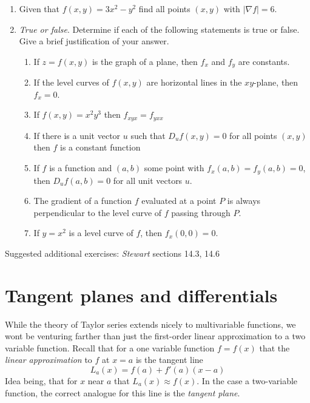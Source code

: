 \documentclass[12pt]{article}
\numberwithin{equation}{subsection}
\numberwithin{figure}{subsection}
\theoremstyle{note}
\begin{document}
{\begin{enumerate}[label=\arabic*.]
\begin{enumerate}
	\item $f(x,y)=5x^2+y^6$
	\item $f(x,y)=(x^2+y^2)^{3/2}$
	\item $f(x,y,z)=y^2z e^x$
\end{enumerate}

\item Given that $f(x,y)=3x^2-y^2$ find all points $(x,y)$ with $|\nabla f|=6$. 


\item \textit{True or false}. Determine if each of the following statements is true or false. Give a brief justification of your answer.

\begin{enumerate}
	\item If $z=f(x,y)$ is the graph of a plane, then $f_x$ and $f_y$ are constants. 
	\item If the level curves of $f(x,y)$ are horizontal lines in the $xy$-plane, then $f_{x}=0$.
	\item If $f(x,y)=x^2y^3$ then $f_{xyx}=f_{yxx}$
	\item If there is a unit vector $u$ such that $D_u f(x,y)=0$ for all points $(x,y)$ then $f$ is a constant function
	\item If $f$ is a function and $(a,b)$ some point with $f_x(a,b)=f_y(a,b)=0$, then $D_uf(a,b)=0$ for all unit vectors $u$.
	\item The gradient of a function $f$ evaluated at a point $P$ is always perpendicular to the level curve of $f$ passing through $P$.
	\item If $y=x^2$ is a level curve of $f$, then $f_x(0,0)=0$. 
\end{enumerate}
\end{enumerate}

Suggested additional exercises: \textit{Stewart} sections 14.3, 14.6

\section{Tangent planes and differentials} \label{sec-tan-plane}

While the theory of Taylor series extends nicely to multivariable functions, we wont be venturing farther than just the first-order linear approximation to a two variable function. Recall that for a one variable function $f=f(x)$ that the \textit{linear approximation} to $f$ at $x=a$ is the tangent line \begin{equation} L_a(x)=f(a)+f'(a)(x-a)\end{equation} Idea being, that for $x$ near $a$ that $L_a(x)\approx f(x)$. In the case a two-variable function, the correct analogue for this line is the \textit{tangent plane}.

}
\end{document}
